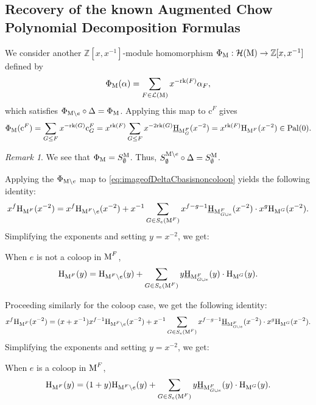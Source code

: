 \documentclass[11pt]{article}
\newcommand{\calH}{\mathcal{H}}
\newcommand{\chow}{\normalfont\text{\underline{H}}}
\newcommand{\augchow}{\normalfont\text{H}}
\newcommand{\rank}{\normalfont\text{rk}}
\newcommand{\M}{\normalfont\text{M}}
\newcommand{\ZZ}{\mathbb{Z}}
\newcommand{\Cbasis}[1]{\mathrm{c}^{#1}}
\newcommand{\pal}{\normalfont\text{Pal}}
\theoremstyle{remark}
\newtheorem*{remark}{Remark} %
\begin{document}
\subsection{Recovery of the known Augmented Chow Polynomial Decomposition Formulas}
We consider another \(\ZZ[x, x^{-1}]\)-module homomorphism
\(\Phi_{\M} : \calH(\M) \to \ZZ[x, x^{-1}]\) defined by
\[\Phi_{\M}(\alpha) = \sum_{F \in \mathcal{L}(\M)} x^{-\rank(F)} \alpha_F,\]
which satisfies \(\Phi_{\M\setminus e}\circ \Delta = \Phi_{\M}\).
Applying this map to \(\Cbasis{F}\) gives
\[\Phi_{\M}(\Cbasis{F}) = \sum_{G \le F} x^{-\rank(G)} \Cbasis{F}_G =
    x^{\rank(F)}\sum_{G \le F} x^{-2\rank(G)} \chow_{\M_G^F}(x^{-2}) =
    x^{\rank(F)} \augchow_{\M^F}(x^{-2}) \in \pal(0).\]
\begin{remark}
    We see that \(\Phi_{\M} = S^{\M}_{\emptyset}\). Thus,
    \(S^{\M\setminus e}_{\emptyset} \circ \Delta = S^{\M}_{\emptyset}\).
\end{remark}

Applying the \(\Phi_{\M\setminus e}\) map to \eqref{eq:imageofDeltaCbasisnoncoloop} yields the following identity:
\[ x^f \augchow_{\M^F}(x^{-2}) = x^f \augchow_{\M^F\setminus e}(x^{-2}) +
    x^{-1}\sum_{G \in S_e(\M^F)} x^{f-g-1}\chow_{\M^F_{G\cup e}}(x^{-2}) \cdot x^g\augchow_{\M^G}(x^{-2}). \]
Simplifying the exponents and setting \(y=x^{-2}\), we get:
\begin{tcolorbox}
    When \(e\) is not a coloop in \(\M^F\),
    \begin{equation} \label{eq:augchow-decomposition-noncoloop}
        \augchow_{\M^F}(y) = \augchow_{\M^F\setminus e}(y) +
        \sum_{G \in S_e(\M^F)} y \chow_{\M^F_{G\cup e}}(y) \cdot \augchow_{\M^G}(y).
    \end{equation}
\end{tcolorbox}
Proceeding similarly for the coloop case, we get the following identity:
\[ x^f \augchow_{\M^F}(x^{-2}) = (x+x^{-1})x^{f-1}\augchow_{\M^F\setminus e}(x^{-2}) +
    x^{-1}\sum_{G \in S_e(\M^F)} x^{f-g-1}\chow_{\M^F_{G\cup e}}(x^{-2}) \cdot x^g\augchow_{\M^G}(x^{-2}). \]
Simplifying the exponents and setting \(y=x^{-2}\), we get:
\begin{tcolorbox}
    When \(e\) is a coloop in \(\M^F\),
    \begin{equation} \label{eq:augchow-decomposition-coloop}
        \augchow_{\M^F}(y) = (1+y)\augchow_{\M^F\setminus e}(y) +
        \sum_{G \in S_e(\M^F)} y \chow_{\M^F_{G\cup e}}(y) \cdot \augchow_{\M^G}(y).
    \end{equation}
\end{tcolorbox}



\end{document}
